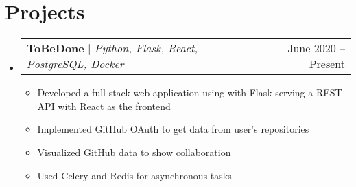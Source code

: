 \documentclass[letterpaper,11pt]{article}
\makeatletter
\newcommand{\resumeItem}[1]{
  \item\small{
    {#1 \vspace{-2pt}}
  }
}
\newcommand{\resumeSubheading}[4]{
  \vspace{-2pt}\item
    \begin{tabular*}{0.97\textwidth}[t]{l@{\extracolsep{\fill}}r}
      \textbf{#1} & #2 \\
      \textit{\small#3} & \textit{\small #4} \\
    \end{tabular*}\vspace{-7pt}
}
\newcommand{\resumeSubSubheading}[2]{
    \item
    \begin{tabular*}{0.97\textwidth}{l@{\extracolsep{\fill}}r}
      \textit{\small#1} & \textit{\small #2} \\
    \end{tabular*}\vspace{-7pt}
}
\newcommand{\resumeProjectHeading}[2]{
    \item
    \begin{tabular*}{0.97\textwidth}{l@{\extracolsep{\fill}}r}
      \small#1 & #2 \\
    \end{tabular*}\vspace{-7pt}
}
\newcommand{\resumeSubHeadingListStart}{\begin{itemize}[leftmargin=0.15in, label={}]}
\newcommand{\resumeSubHeadingListEnd}{\end{itemize}}
\newcommand{\resumeItemListStart}{\begin{itemize}}
\newcommand{\resumeItemListEnd}{\end{itemize}\vspace{-5pt}}
\makeatother
\begin{document}





\section{Projects}
    \resumeSubHeadingListStart
      \resumeProjectHeading
          {\textbf{ToBeDone} $|$ \emph{Python, Flask, React, PostgreSQL, Docker}}{June 2020 -- Present}
          \resumeItemListStart
            \resumeItem{Developed a full-stack web application using with Flask serving a REST API with React as the frontend}
            \resumeItem{Implemented GitHub OAuth to get data from user’s repositories}
            \resumeItem{Visualized GitHub data to show collaboration}
            \resumeItem{Used Celery and Redis for asynchronous tasks}
          \resumeItemListEnd
    \resumeSubHeadingListEnd
\end{document}
